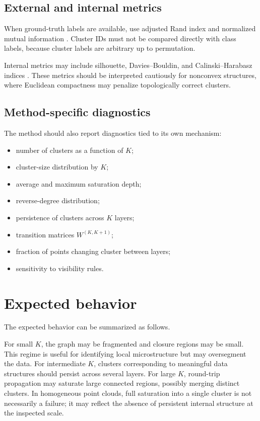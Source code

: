 \documentclass[11pt,a4paper]{article}
\begin{document}
\subsection{External and internal metrics}

When ground-truth labels are available, use adjusted Rand index and normalized mutual information \citep{HubertArabie1985,VinhEppsBailey2010}. Cluster IDs must not be compared directly with class labels, because cluster labels are arbitrary up to permutation.

Internal metrics may include silhouette, Davies--Bouldin, and Calinski--Harabasz indices \citep{Rousseeuw1987,DaviesBouldin1979,CalinskiHarabasz1974}. These metrics should be interpreted cautiously for nonconvex structures, where Euclidean compactness may penalize topologically correct clusters.

\subsection{Method-specific diagnostics}

The method should also report diagnostics tied to its own mechanism:
\begin{itemize}
    \item number of clusters as a function of $K$;
    \item cluster-size distribution by $K$;
    \item average and maximum saturation depth;
    \item reverse-degree distribution;
    \item persistence of clusters across $K$ layers;
    \item transition matrices $W^{(K,K+1)}$;
    \item fraction of points changing cluster between layers;
    \item sensitivity to visibility rules.
\end{itemize}

\section{Expected behavior}

The expected behavior can be summarized as follows.

For small $K$, the graph may be fragmented and closure regions may be small. This regime is useful for identifying local microstructure but may oversegment the data. For intermediate $K$, clusters corresponding to meaningful data structures should persist across several layers. For large $K$, round-trip propagation may saturate large connected regions, possibly merging distinct clusters. In homogeneous point clouds, full saturation into a single cluster is not necessarily a failure; it may reflect the absence of persistent internal structure at the inspected scale.
\end{document}
